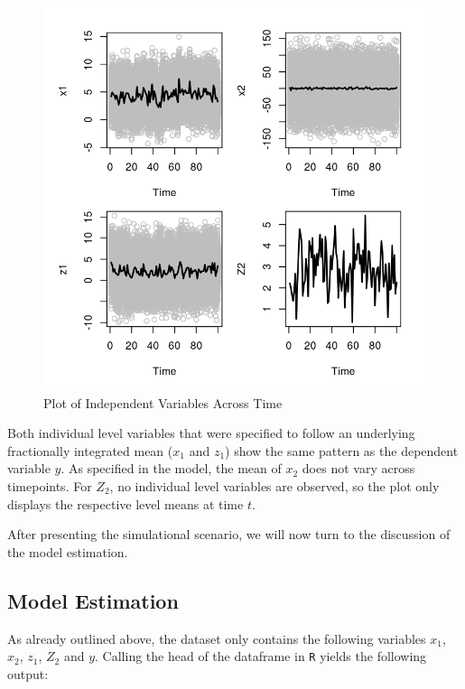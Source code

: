 \documentclass[12pt]{paper}\usepackage[]{graphicx}\usepackage[]{color}
\makeatletter
\def\maxwidth{ %
  \ifdim\Gin@nat@width>\linewidth
    \linewidth
  \else
    \Gin@nat@width
  \fi
}
\newenvironment{knitrout}{}{} %
\makeatother
\begin{document}
\begin{figure}[ht]\centering
\caption{Plot of Independent Variables Across Time}\label{fig:ivs}
\begin{knitrout}
\color{fgcolor}
\includegraphics[width=\maxwidth]{figure/unnamed-chunk-7-1} 

\end{knitrout}
\end{figure}

Both individual level variables that were specified to follow an underlying fractionally integrated mean ($x_1$ and $z_1$) show the same pattern as the dependent variable $y$. As specified in the model, the mean of $x_2$ does not vary across timepoints. For $Z_2$, no individual level variables are observed, so the plot only displays the respective level means at time $t$.

After presenting the simulational scenario, we will now turn to the discussion of the model estimation.

\subsection{Model Estimation}

As already outlined above, the dataset only contains the following variables $x_1$, $x_2$, $z_1$, $Z_2$ and $y$. Calling the head of the dataframe in \texttt{R} yields the following output:
\end{document}
